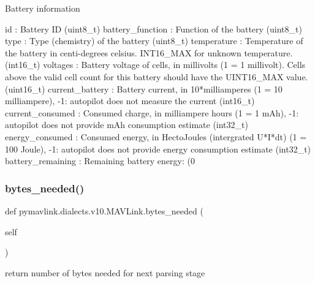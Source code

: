 \begin{DoxyVerb}
\begin{DoxyVerb}Battery information

id                        : Battery ID (uint8_t)
battery_function          : Function of the battery (uint8_t)
type                      : Type (chemistry) of the battery (uint8_t)
temperature               : Temperature of the battery in centi-degrees celsius. INT16_MAX for unknown temperature. (int16_t)
voltages                  : Battery voltage of cells, in millivolts (1 = 1 millivolt). Cells above the valid cell count for this battery should have the UINT16_MAX value. (uint16_t)
current_battery           : Battery current, in 10*milliamperes (1 = 10 milliampere), -1: autopilot does not measure the current (int16_t)
current_consumed          : Consumed charge, in milliampere hours (1 = 1 mAh), -1: autopilot does not provide mAh consumption estimate (int32_t)
energy_consumed           : Consumed energy, in HectoJoules (intergrated U*I*dt)  (1 = 100 Joule), -1: autopilot does not provide energy consumption estimate (int32_t)
battery_remaining         : Remaining battery energy: (0%
 \mbox{\label{classpymavlink_1_1dialects_1_1v10_1_1MAVLink_a34334ce42a9a0ae5436d693593b6a65f}} 
\subsubsection{\texorpdfstring{bytes\+\_\+needed()}{bytes\_needed()}}
{\footnotesize\ttfamily def pymavlink.\+dialects.\+v10.\+M\+A\+V\+Link.\+bytes\+\_\+needed (\begin{DoxyParamCaption}\item[{}]{self }\end{DoxyParamCaption})}

\begin{DoxyVerb}return number of bytes needed for next parsing stage\end{DoxyVerb}
 \mbox{\label{classpymavlink_1_1dialects_1_1v10_1_1MAVLink_a3fb4c2b7eeef3301af15e4b3c0106764}} 

\end{DoxyVerb}
\end{DoxyVerb}
